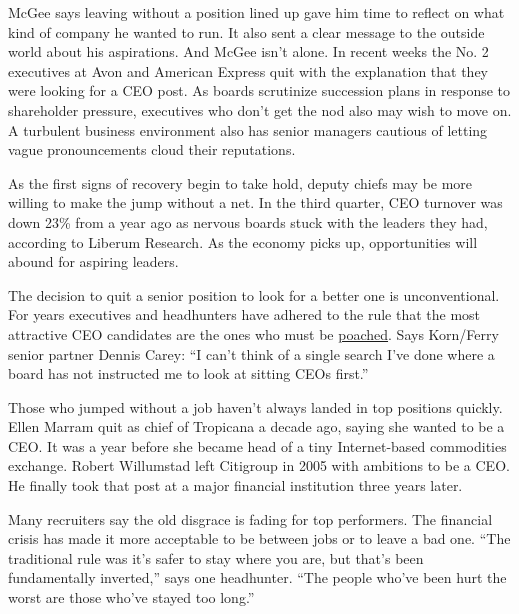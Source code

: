 McGee says leaving without a position lined up gave him time to reflect
on what kind of company he wanted to run. It also sent a clear message
to the outside world about his aspirations. And McGee isn't alone. In
recent weeks the No. 2 executives at Avon and American Express quit with
the explanation that they were looking for a CEO post. As boards
scrutinize succession plans in response to shareholder pressure,
executives who don't get the nod also may wish to move on. A turbulent
business environment also has senior managers cautious of letting vague
pronouncements cloud their reputations.

As the first signs of recovery begin to take hold, deputy chiefs may be
more willing to make the jump without a net. In the third quarter, CEO
turnover was down 23\% from a year ago as nervous boards stuck with the
leaders they had, according to Liberum Research. As the economy picks
up, opportunities will abound for aspiring leaders.

The decision to quit a senior position to look for a better one is
unconventional. For years executives and headhunters have adhered to the
rule that the most attractive CEO candidates are the ones who must
be \uline{poached}. Says Korn/Ferry senior partner Dennis Carey: ``I
can't think of a single search I've done where a board has not
instructed me to look at sitting CEOs first.''

Those who jumped without a job haven't always landed in top positions
quickly. Ellen Marram quit as chief of Tropicana a decade ago, saying
she wanted to be a CEO. It was a year before she became head of a tiny
Internet-based commodities exchange. Robert Willumstad left Citigroup in
2005 with ambitions to be a CEO. He finally took that post at a major
financial institution three years later.

Many recruiters say the old disgrace is fading for top performers. The
financial crisis has made it more acceptable to be between jobs or to
leave a bad one. ``The traditional rule was it's safer to stay where you
are, but that's been fundamentally inverted,'' says one headhunter.
``The people who've been hurt the worst are those who've stayed too
long.''


